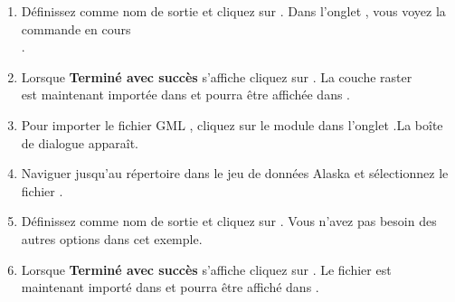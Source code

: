 \begin{enumerate}
  \item Définissez  comme nom de sortie et cliquez sur . Dans l'onglet , vous voyez la commande \grass en cours\\ .
  \item Lorsque \textbf{Terminé avec succès} s'affiche cliquez sur . 
  La couche raster\\  est maintenant importée dans \grass et pourra être affichée dans \qg.
  
  \item Pour importer le fichier GML , cliquez sur le module  dans l'onglet .La boîte de dialogue   apparaît.
  \item Naviguer jusqu'au répertoire  dans le jeu de données \qg Alaska et sélectionnez le fichier .
  \item Définissez  comme nom de sortie et cliquez sur . Vous n'avez pas besoin des autres options dans cet exemple.
  \item Lorsque \textbf{Terminé avec succès} s'affiche cliquez sur . 
  Le fichier  est maintenant importé dans \grass et pourra être affiché dans \qg.
 
\end{enumerate}


